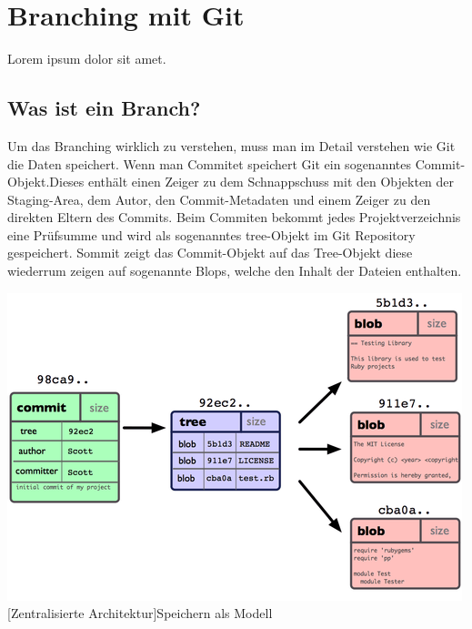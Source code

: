 \documentclass[12pt,a4paper,bibliography=totocnumbered,listof=totocnumbered]{scrartcl}
\begin{document}




\section{Branching mit Git}
Lorem ipsum dolor sit amet.

\subsection{Was ist ein Branch?}
Um das Branching wirklich zu verstehen, muss man im Detail verstehen wie Git die Daten speichert.	Wenn man Commitet speichert Git	ein sogenanntes Commit-Objekt.Dieses enthält einen Zeiger zu dem Schnappschuss mit den Objekten der Staging-Area, dem Autor, den Commit-Metadaten und einem Zeiger zu den direkten Eltern des Commits. Beim Commiten bekommt jedes Projektverzeichnis eine Prüfsumme und wird  als sogenanntes tree-Objekt im Git Repository gespeichert. Sommit zeigt das Commit-Objekt auf das Tree-Objekt	diese wiederrum zeigen auf sogenannte Blops, welche den Inhalt der Dateien enthalten.	
\vspace{1em}
\begin{minipage}{\linewidth}
	\centering
	\includegraphics[width=0.6\linewidth]{Bilder/speichern.png}
	[Zentralisierte Architektur]{Speichern als Modell\footnotemark }
	\label{fig:gitspeichern}
\end{minipage} 	
\end{document}
